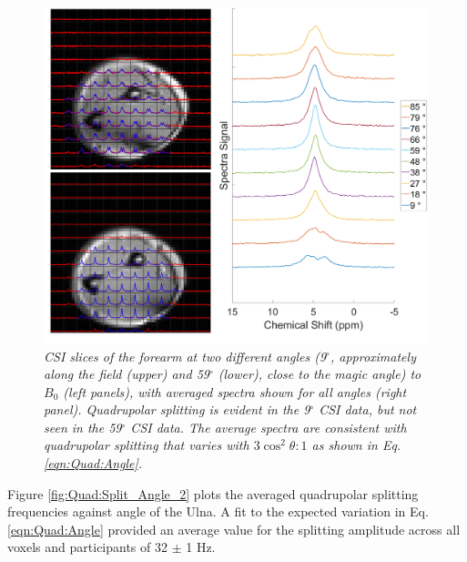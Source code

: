 \begin{figure}
    \centering
    \includegraphics[width=1\textwidth]{Figures/Quad/Arm_CSI_Angle.png}
    \caption{\textit{\ac{CSI} slices of the forearm at two different angles (9$^\circ$, approximately along the field (upper) and 59$^\circ$ (lower), close to the magic angle) to $B_0$ (left panels), with averaged spectra shown for all angles (right panel). Quadrupolar splitting is evident in the 9$^\circ$ \ac{CSI} data, but not seen in the 59$^\circ$ \ac{CSI} data. The average spectra are consistent with quadrupolar splitting that varies with $3\cos^2\theta: 1$ as shown in Eq. \ref{eqn:Quad:Angle}.}}
    \label{fig:Quad:Arm_CSI}
\end{figure}

 Figure \ref{fig:Quad:Split_Angle_2} plots the averaged quadrupolar splitting frequencies against angle of the Ulna. A fit to the expected variation in Eq. \ref{eqn:Quad:Angle} provided an average value for the splitting amplitude across all voxels and participants of 32 $\pm$ 1 Hz. 

